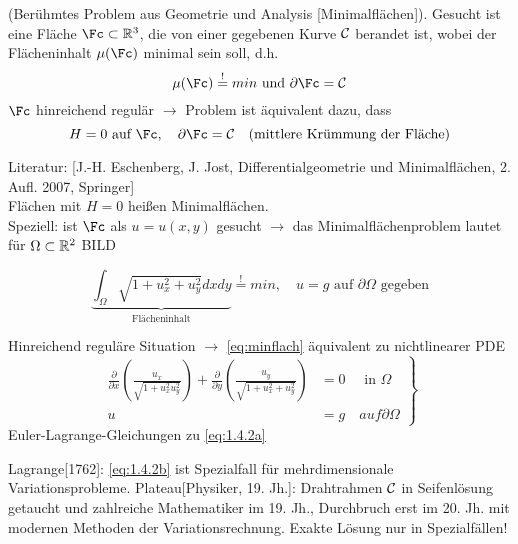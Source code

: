 \begin{beispiel} %
    (Berühmtes Problem aus Geometrie und Analysis [Minimalflächen]). Gesucht ist eine Fläche  $\Fc\subset\R^3$, die von einer gegebenen Kurve $\mathcal{C}$ berandet ist, wobei der Flächeninhalt $\mu(\Fc)$ minimal sein soll, d.h.
    \[
        \mu(\Fc) \overset{!}{=} min \text{ und } \partial\Fc = \Cc
    \]
    $\Fc$ hinreichend regulär $\to$ Problem ist äquivalent dazu, dass 
    \[
        H=0 \text{ auf } \Fc, \quad \partial\Fc=\Cc \quad \text{(mittlere Krümmung der Fläche)}
    \]

    Literatur: [J.-H. Eschenberg, J. Jost, Differentialgeometrie und Minimalflächen, 2. Aufl. 2007, Springer]\\

    Flächen mit $H=0$ heißen Minimalflächen.\\
    Speziell: ist $\Fc$ als $u=u(x,y)$ gesucht $\to$ das Minimalflächenproblem lautet für $\Omega\subset\mathbb{R}^2$
    BILD
    
    \begin{equation}%
        \underbrace{\int_{\Omega} \sqrt{1 + u_x^2 + u_y^2} dx dy}_{\text{Flächeninhalt}} \overset{!}{=} min, \quad u=g \text{ auf } \partial\Omega \text{ gegeben}
        \label{eq:minflach}
    \end{equation}

    Hinreichend reguläre Situation $\to$ \eqref{eq:minflach} äquivalent zu nichtlinearer PDE
    \begin{equation} %
        \left.
        \begin{aligned}
            \frac{\partial}{\partial x} \left( \frac{u_x}{\sqrt{1+u_x^2u_y^2}} \right) +  \frac{\partial}{\partial y} \left( \frac{u_y}{\sqrt{1+u_x^2+u_y^2}} \right) &= 0 \quad \text{ in } \Omega\\
            u &= g \quad { auf } \partial\Omega
        \end{aligned}
    \right\}
        \label{}
    \end{equation}
    Euler-Lagrange-Gleichungen zu \eqref{eq:1.4.2a}

    Lagrange[1762]: \eqref{eq:1.4.2b} ist Spezialfall für mehrdimensionale Variationsprobleme. 
    Plateau[Physiker, 19. Jh.]: Drahtrahmen $\mathcal{C}$ in Seifenlösung getaucht und zahlreiche Mathematiker im 19. Jh., Durchbruch erst im 20. Jh. mit modernen Methoden der Variationsrechnung. Exakte Lösung nur in Spezialfällen!


\end{beispiel}
